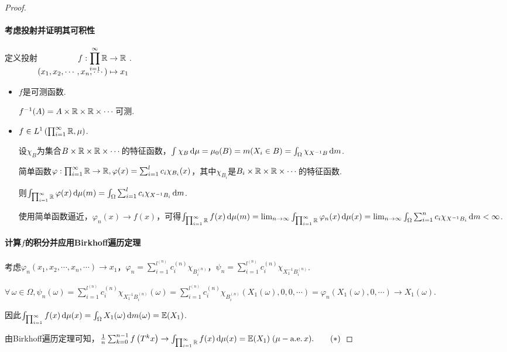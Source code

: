 \begin{proof}
    \paragraph{考虑投射并证明其可积性}定义投射$\setjot[-6]\begin{aligned}[t]
        f:\prod_{i=1}^\infty{\mb{R}} &\to \mb{R} \\
        (x_1,x_2,\cdots,x_n,\cdots) &\mapsto x_1
    \end{aligned}$.\par
    \begin{itemize}
        \item $f$是可测函数.\par
        $f^{-1}(A)=A\times\mathbb{R}\times\mathbb{R}\times\cdots$可测.\par
        \item $f\in L^1 \left(\prod_{i=1}^\infty{\mathbb{R}},\mu\right)$.\par
        设$\chi_B$为集合$B\times\mathbb{R}\times\mathbb{R}\times\cdots$的特征函数，$\int{\chi_B}\mathop{}\!\mathrm{d}\mu=\mu_0(B)=m(X_i\in B)=\int_\Omega{\chi_{X^{-1}B}}\mathop{}\!\mathrm{d} m$.\par
        简单函数$\varphi:\prod_{i=1}^\infty\mathbb{R}\to\mathbb{R},\varphi(x)=\sum_{i=1}^l{c_i\chi_{B_i}(x)}$，其中$\chi_{B_i}$是$B_i\times\mathbb{R}\times\mathbb{R}\times\cdots$的特征函数.\par
        则$\int_{\prod_{i=1}^\infty{\mathbb{R}}}{\varphi(x)}\mathop{}\!\mathrm{d} \mu(m)=\int_\Omega{\sum_{i=1}^l{c_i\chi_{X^{-1}B_i}}}\mathop{}\!\mathrm{d} m$.\par
        使用简单函数逼近，$\varphi_n(x)\to f(x)$，可得$\int_{\prod_{i=1}^\infty{\mathbb{R}}}{f(x)}\mathop{}\!\mathrm{d} \mu(m)=\lim_{n\to\infty}{\int_{\prod_{i=1}^\infty{\mathbb{R}}}{\varphi_n(x)}\mathop{}\!\mathrm{d} \mu(x)}=\lim_{n\to\infty}\int_\Omega{\sum_{i=1}^n{c_i\chi_{X^{-1}B_i}}}\mathop{}\!\mathrm{d} m<\infty$.\par
    \end{itemize}\par
    \paragraph{计算$f$的积分并应用Birkhoff遍历定理}\par


    考虑$\varphi_n(x_1,x_2,\cdots,x_n,\cdots)\to x_1$，$\varphi_n=\sum_{i=1}^{l^{(n)}}{c_i^{(n)}\chi_{B_i^{(n)}}}$，$\psi_n=\sum_{i=1}^{l^{(n)}}{c_i^{(n)}\chi_{X_1^{-1}B_i^{(n)}}}$.\par
    $\forall\,\omega\in\Omega,\psi_n(\omega)=\sum_{i=1}^{l^{(n)}}{c_i^{(n)}\chi_{X_1^{-1}B_i^{(n)}}(\omega)}=\sum_{i=1}^{l^{(n)}}{c_i^{(n)}\chi_{B_i^{(n)}}(X_1(\omega),0,0,\cdots)}=\varphi_n(X_1(\omega),0,\cdots)\to X_1(\omega)$.\par
    因此$\int_{\prod_{i=1}^\infty}{f(x)}\mathop{}\!\mathrm{d} \mu(x)=\int_\Omega{X_1(\omega)}\mathop{}\!\mathrm{d} m(\omega)=\mathbb{E}(X_1)$.\par
    由Birkhoff遍历定理可知，$\frac{1}{n}\sum_{k=0}^{n-1}{f\left(T^k{x}\right)}\to \int_{\prod_{i=1}^\infty{\mathbb{R}}}{f(x)}\mathop{}\!\mathrm{d} \mu(x)=\mathbb{E}(X_1)\;(\mu-\operatorname{\text{a.e.}} x).\quad\quad(*)$\par

\end{proof}
